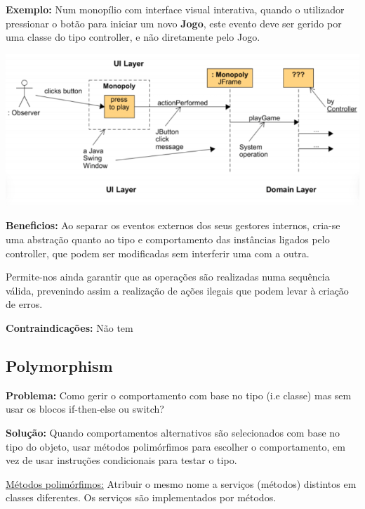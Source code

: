 \documentclass{article}
\begin{document}
\begin{flushleft}
    \textbf{Exemplo:} Num monopílio com interface visual interativa, quando o utilizador pressionar o botão para iniciar um novo
    \textbf{Jogo}, este evento deve ser gerido por uma classe do tipo controller, e não diretamente pelo Jogo.

    \begin{center}
        \includegraphics[scale=0.5]{Images/17.png}
    \end{center}
\end{flushleft}

\begin{flushleft}
    \textbf{Beneficios:} 
    Ao separar os eventos externos dos seus gestores internos, cria-se uma abstração
quanto ao tipo e comportamento das instâncias ligados pelo controller, que podem
ser modificadas sem interferir uma com a outra.

Permite-nos ainda garantir que as operações são realizadas numa sequência válida,
prevenindo assim a realização de ações ilegais que podem levar à criação de erros.
\end{flushleft}

\begin{flushleft}
    \textbf{Contraindicações:} Não tem
\end{flushleft}

\pagebreak
\subsection{Polymorphism}

\begin{flushleft}
    \textbf{Problema:} Como gerir o comportamento com base no tipo (i.e classe)
    mas sem usar os blocos if-then-else ou switch?

    \vspace{3mm}
    \textbf{Solução:} Quando comportamentos alternativos são selecionados com base
    no tipo do objeto, usar métodos polimórfimos para escolher o comportamento,
    em vez de usar instruções condicionais para testar o tipo.

    \uline{Métodos polimórfimos:} Atribuir o mesmo nome a serviços
    (métodos) distintos em classes diferentes. Os serviços são implementados por métodos.
\end{flushleft}
\end{document}
